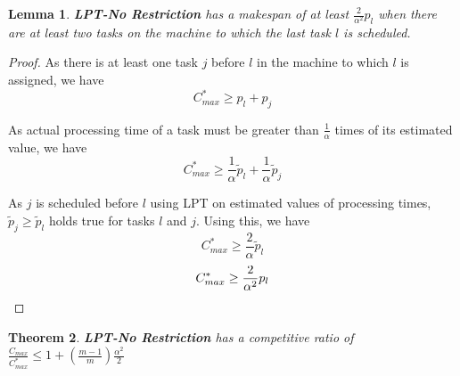 \documentclass[10pt, conference, compsocconf]{IEEEtran}
\newtheorem{theorem}{Theorem}[section]
\newtheorem{lemma}[theorem]{Lemma}
\begin{document}
\begin{lemma}\label{No Restriction}
 \textbf{LPT-No Restriction} has a makespan of at least $ {\frac{2}{\alpha^{2}}} p_l $ when there are at least two tasks on the machine to which the last task $l$ is scheduled. 
\end{lemma}
\begin{proof}
As there is at least one task $j$ before $l$ in the machine to which $l$ is assigned, we have
\begin{equation}\nonumber
C_{max}^{*}\geq p_l + p_j
\end{equation}	

As actual processing time of a task must be greater than $\frac{1}{\alpha}$ times of its estimated value, we have
\begin{equation}\nonumber 
C_{max}^{*} \geq \frac{1}{\alpha}\tilde p_l +  \frac{1}{\alpha} \tilde p_j 
\end{equation}

As $j$ is scheduled before $l$ using LPT on estimated values of processing times,  $\tilde p_j\geq   \tilde p_l$ holds true for tasks $l$ and $j$.  Using this, we have
\begin{equation}\nonumber
 C_{max}^{*} \geq \frac{2}{\alpha}\tilde p_l
 \end{equation}
\begin{equation}{\nonumber}
 C_{max}^{*} \geq {\frac{2}{\alpha^{2}}} p_l  \end{equation}

 \end{proof}

\begin{theorem}
\textbf{LPT-No Restriction} has a competitive  ratio of  $\frac{C_{max}}{C_{max}^{*}} \leq 1 + (\frac{m-1}{m})\frac{\alpha^{2}}{2}$
\end{theorem} 
\end{document}
